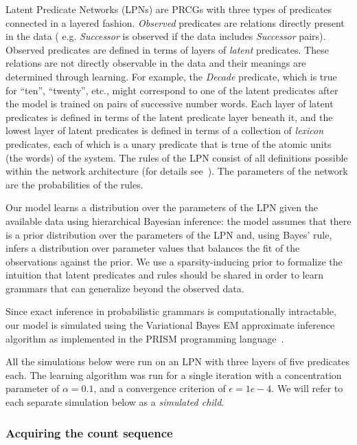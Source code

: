 \documentclass[10pt,letterpaper]{article}
\begin{document}
Latent Predicate Networks (LPNs) are PRCGs with three types of
predicates connected in a layered fashion. \emph{Observed} predicates
are relations directly present in the data ( e.g. \emph{Successor} is
observed if the data includes \emph{Successor} pairs). Observed
predicates are defined in terms of layers of \emph{latent} predicates.
These relations are not directly observable in the data and their
meanings are determined through learning. For example, the
\emph{Decade} predicate, which is true for ``ten'', ``twenty'', etc.,
might correspond to one of the latent predicates after the model is
trained on pairs of successive number words. Each layer of latent
predicates is defined in terms of the latent predicate layer beneath
it, and the lowest layer of latent predicates is defined in terms of a
collection of \emph{lexicon} predicates, each of which is a unary
predicate that is true of the atomic units (the words) of the system.
The rules of the LPN consist of all definitions possible within the
network architecture (for details see~\cite{DecRulTen2015}). The
parameters of the network are the probabilities of the rules.

Our model learns a distribution over the parameters of the LPN given
the available data using hierarchical Bayesian inference: the model
assumes that there is a prior distribution over the parameters of the
LPN and, using Bayes' rule, infers a distribution over parameter
values that balances the fit of the observations against the prior. We
use a sparsity-inducing prior to formalize the intuition that latent
predicates and rules should be shared in order to learn grammars that
can generalize beyond the observed data.

Since exact inference in probabilistic grammars is computationally
intractable, our model is simulated using the Variational Bayes EM
approximate inference algorithm as implemented in the PRISM
programming language~\citep{sato2008variational}.

All the simulations below were run on an LPN with three layers of five
predicates each. The learning algorithm was run for a single
iteration with a concentration parameter of $\alpha=0.1$, and a convergence
criterion of $\epsilon=1e-4$. We will refer to each separate
simulation below as a \emph{simulated child}.

\subsubsection{Acquiring the count sequence}
\end{document}

